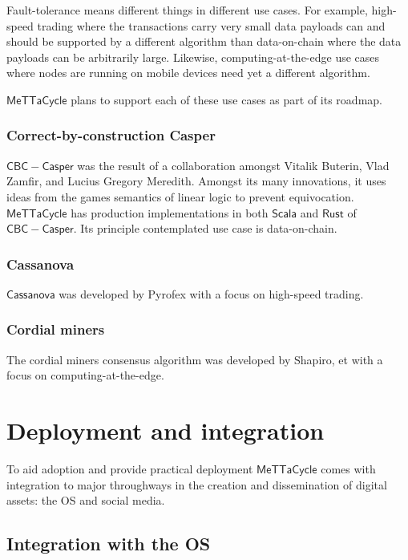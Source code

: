 \documentclass{article}
\newcommand{\MC}{\mathsf{MeTTaCycle}}
\begin{document}
Fault-tolerance means different things in different use cases. For
example, high-speed trading where the transactions carry very small
data payloads can and should be supported by a different algorithm
than data-on-chain where the data payloads can be arbitrarily
large. Likewise, computing-at-the-edge use cases where nodes are
running on mobile devices need yet a different algorithm.

$\MC$ plans to support each of these use cases as part of its roadmap.

\subsubsection{Correct-by-construction Casper}

$\mathsf{CBC-Casper}$ was the result of a collaboration amongst
Vitalik Buterin, Vlad Zamfir, and Lucius Gregory Meredith. Amongst its
many innovations, it uses ideas from the games semantics of linear
logic to prevent equivocation. $\MC$ has production implementations in
both $\mathsf{Scala}$ and $\mathsf{Rust}$ of
$\mathsf{CBC-Casper}$. Its principle contemplated use case is
data-on-chain.

\subsubsection{Cassanova}

$\mathsf{Cassanova}$ was developed by Pyrofex with a focus on
high-speed trading.

\subsubsection{Cordial miners}

The cordial miners consensus algorithm was developed by Shapiro, et
with a focus on computing-at-the-edge.

\section{Deployment and integration}
\label{Deployment and integration}

To aid adoption and provide practical deployment $\MC$ comes with
integration to major throughways in the creation and dissemination of
digital assets: the OS and social media.

\subsection{Integration with the OS}
\end{document}
